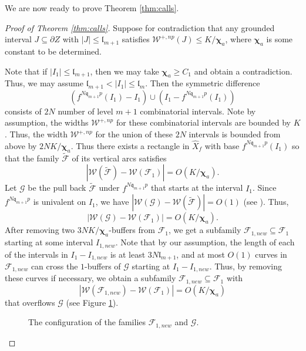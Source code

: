 \documentclass[11pt, reqno]{amsart}
\newcommand{\incfig}[1]{%
    \def\svgwidth{\columnwidth}
    {#1.pdf_tex}
}
\numberwithin{equation}{section}
\theoremstyle{plain}
\theoremstyle{theorem}
\theoremstyle{plain}
\theoremstyle{definition}
\numberwithin{figure}{section}
\newcommand{\length}{{\mathfrak l}}
\begin{document}
We are now ready to prove Theorem \ref{thm:calls}.
\begin{proof}[Proof of Theorem \ref{thm:calls}]
Suppose for contradiction that any grounded interval $J \subseteq \partial Z$ with $\vert J \vert \leq \length_{m+1}$ satisfies $\mathcal{W}^{+, np}(J) \leq K/\boldsymbol{\chi}_a$, where $\boldsymbol{\chi}_a$ is some constant to be determined.

Note that if $\vert I_1 \vert \leq \mathfrak{l}_{m+1}$, then we may take $\boldsymbol{\chi}_a \geq C_1$ and obtain a contradiction.
Thus, we may assume $\mathfrak{l}_{m+1} < \vert I_1 \vert \leq \mathfrak{l}_m$.
Then the symmetric difference 
$$
(f^{N\mathfrak{q}_{m+1}p}(I_1) - I_1) \cup (I_1 - f^{N\mathfrak{q}_{m+1}p}(I_1))
$$
consists of $2N$ number of level $m+1$ combinatorial intervals.
Note by assumption, the widths $\mathcal{W}^{+, np}$ for these combinatorial intervals are bounded by $K$.
Thus, the width $\mathcal{W}^{+, np}$ for the union of these $2N$ intervals is bounded from above by $2N K/\boldsymbol{\chi}_a$.
Thus there exists a rectangle in $\widehat X_f$ with base $f^{N\mathfrak{q}_{m+1}p}(I_1)$ so that the family $\widetilde{\mathcal{F}}$ of its vertical arcs satisfies
$$
|\mathcal{W}(\widetilde{\mathcal{F}}) - \mathcal{W}(\mathcal{F}_1)| = O(K/\boldsymbol{\chi}_a).
$$
Let $\mathcal{G}$ be the pull back $\widetilde{\mathcal{F}}$ under $f^{N\mathfrak{q}_{m+1}p}$ that starts at the interval $I_1$.
Since $f^{N\mathfrak{q}_{m+1}p}$ is univalent on $I_1$, we have
$|\mathcal{W}(\mathcal{G}) - \mathcal{W}(\widetilde{\mathcal{F}})| = O(1)$ (see \cite[Lemma A.10]{DL22}).
Thus,
$$
|\mathcal{W}(\mathcal{G}) - \mathcal{W}(\mathcal{F}_1)| = O(K/\boldsymbol{\chi}_a).
$$
After removing two $3NK/\boldsymbol{\chi}_a$-buffers from $\mathcal{F}_1$, we get a subfamily $\mathcal{F}_{1, new} \subseteq \mathcal{F}_1$ starting at some interval $I_{1, new}$.
Note that by our assumption, the length of each of the intervals in $I_1 - I_{1, new}$ is at least $3N\length_{m+1}$, and at most $O(1)$ curves in $\mathcal{F}_{1, new}$ can cross the $1$-buffers of $\mathcal{G}$ starting at $I_1 - I_{1, new}$.
Thus, by removing these curves if necessary, we obtain a subfamily $\mathcal{F}_{1, new} \subseteq \mathcal{F}_1$ with
$$
|\mathcal{W}(\mathcal{F}_{1, new}) - \mathcal{W}(\mathcal{F}_1)| = O(K/\boldsymbol{\chi}_a)
$$
that overflows $\mathcal{G}$ (see Figure \ref{fig:ShL}).

\begin{figure}[ht]
  \centering
  \resizebox{\linewidth}{!}{
  \incfig{ShL}
  }
  \caption{The configuration of the families $\mathcal{F}_{1, new}$ and $\mathcal{G}$.}
  \label{fig:ShL}
\end{figure}


\end{proof}
\end{document}
